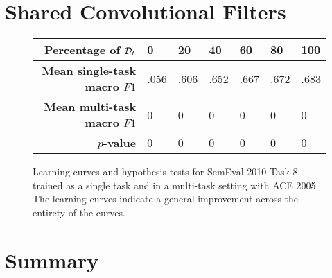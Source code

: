 \section{Shared Convolutional Filters}
\begin{figure}[h]
	\centering
	
		\vspace*{1cm}
	
	\begin{tabular}{r | l | l | l | l | l | l}
		\textbf{Percentage of $\mathcal{D}_t$} & 0 & 20 & 40 & 60 & 80 & 100 \\  \hline
		\textbf{Mean single-task macro $F1$} & .056 & .606 & .652 & .667 & .672 & .683\\
		\textbf{Mean multi-task macro $F1$} & 0 & 0 & 0 & 0 & 0 & 0\\
		$p$\textbf{-value} & 0 & 0 & 0 & 0 & 0 & 0
	\end{tabular}
	\caption{Learning curves and hypothesis tests for SemEval 2010 Task 8 trained as a single task and in a multi-task setting with ACE 2005. The learning curves indicate a general improvement across the entirety of the curves.}
\end{figure}



\section{Summary}